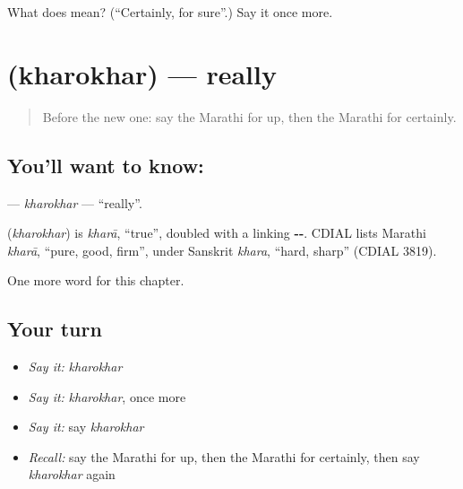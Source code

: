 \begin{tcolorbox}[breakable,colback=teal!4,colframe=teal!35!black,title={Before you move on}]
What does  mean? (\textquotedblleft{}Certainly, for sure\textquotedblright{}.) Say it once more.
\end{tcolorbox}
\section[\texorpdfstring{\mr{खरोखर} (kharokhar)}{खरोखर (kharokhar)}]{ (kharokhar) — really}

\label{lesson:MR-C203-kharokhar}



\begin{quote}
Before the new one: say the Marathi for up, then the Marathi for certainly.
\end{quote}

\subsection*{You'll want to know: }
\textbf{} — \emph{kharokhar} — \textquotedblleft{}really\textquotedblright{}.

\begin{cousinweb}
\textbf{} (\emph{kharokhar}) is \emph{kharā}, \textquotedblleft{}true\textquotedblright{}, doubled with a linking \textbf{--}. CDIAL lists Marathi \emph{kharā}, \textquotedblleft{}pure, good, firm\textquotedblright{}, under Sanskrit \emph{khara}, \textquotedblleft{}hard, sharp\textquotedblright{} (CDIAL 3819).
\end{cousinweb}

\begin{grammarlens}[title={What you've built}]
One more word for this chapter.
\end{grammarlens}

\subsection*{Your turn}
\begin{itemize}
\raggedright
  \item \emph{Say it:} \emph{kharokhar}
  \item \emph{Say it:} \emph{kharokhar}, once more
  \item \emph{Say it:} say \emph{kharokhar}
  \item \emph{Recall:} say the Marathi for up, then the Marathi for certainly, then say \emph{kharokhar} again
\end{itemize}

